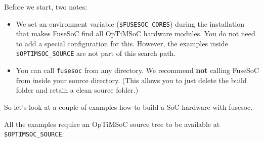 Before we start, two notes:
\begin{itemize}
 \item We set an environment variable (\verb|$FUSESOC_CORES|) during the installation that makes FuseSoC find all OpTiMSoC hardware modules. You do not need to add a special configuration for this. However, the examples inside \verb|$OPTIMSOC_SOURCE| are not part of this search path.
 \item You can call \verb|fusesoc| from any directory. We recommend \textbf{not} calling FuseSoC from inside your source directory. (This allows you to just delete the build folder and retain a clean source folder.)
\end{itemize}

So let's look at a couple of examples how to build a SoC hardware with fusesoc.

\begin{docnote}
All the examples require an OpTiMSoC source tree to be available at \verb|$OPTIMSOC_SOURCE|.
\end{docnote}


